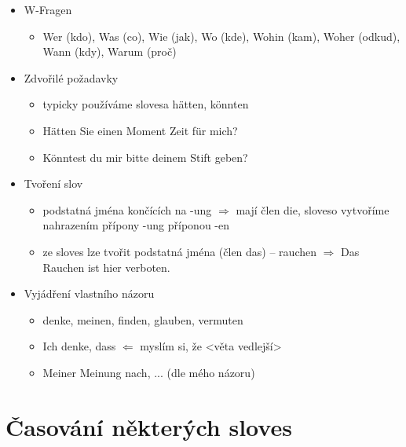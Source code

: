 \documentclass[a4paper,12pt]{report}
\begin{document}
\begin{itemize}
  \item W-Fragen
    \begin{itemize}
      \item Wer (kdo), Was (co), Wie (jak), Wo (kde), Wohin (kam), Woher (odkud), Wann (kdy), Warum (proč)
    \end{itemize}
  \item Zdvořilé požadavky
    \begin{itemize}
      \item typicky používáme slovesa hätten, könnten
      \item Hätten Sie einen Moment Zeit für mich?
      \item Könntest du mir bitte deinem Stift geben?
    \end{itemize}
  \item Tvoření slov
    \begin{itemize}
      \item podstatná jména končících na -ung $\Rightarrow$ mají člen die, sloveso vytvoříme nahrazením přípony -ung příponou -en
      \item ze sloves lze tvořit podstatná jména (člen das) -- rauchen $\Rightarrow$ Das Rauchen ist hier verboten.
    \end{itemize}
  \item Vyjádření vlastního názoru
    \begin{itemize}
      \item denke, meinen, finden, glauben, vermuten
      \item Ich denke, dass $\Leftarrow$ myslím si, že <věta vedlejší>
      \item Meiner Meinung nach, ... (dle mého názoru)
    \end{itemize}
\end{itemize}

\newpage

\section{Časování některých sloves}
\end{document}
